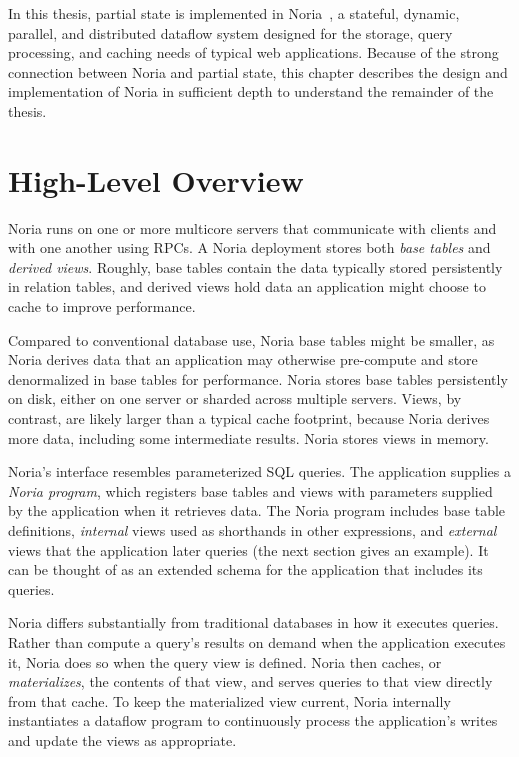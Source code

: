 In this thesis, partial state is implemented in Noria~\cite{noria}, a stateful,
dynamic, parallel, and distributed dataflow system designed for the storage,
query processing, and caching needs of typical web applications. Because of the
strong connection between Noria and partial state, this chapter describes the
design and implementation of Noria in sufficient depth to understand the
remainder of the thesis.

\section{High-Level Overview}

Noria runs on one or more multicore servers that communicate with clients and
with one another using RPCs. A Noria deployment stores both \emph{base tables}
and \emph{derived views}. Roughly, base tables contain the data typically stored
persistently in relation tables, and derived views hold data an application
might choose to cache to improve performance.

Compared to conventional database use, Noria base tables might be smaller, as
Noria derives data that an application may otherwise pre-compute and store
denormalized in base tables for performance. Noria stores base tables
persistently on disk, either on one server or sharded across multiple servers.
Views, by contrast, are likely larger than a typical cache footprint, because
Noria derives more data, including some intermediate results. Noria stores views
in memory.

Noria's interface resembles parameterized SQL queries. The application supplies
a \emph{Noria program}, which registers base tables and views with parameters
supplied by the application when it retrieves data. The Noria program includes
base table definitions, \emph{internal} views used as shorthands in other
expressions, and \emph{external} views that the application later queries
(the next section gives an example). It can be thought of as an extended schema
for the application that includes its queries.

Noria differs substantially from traditional databases in how it executes
queries. Rather than compute a query's results on demand when the application
executes it, Noria does so when the query view is defined. Noria then caches, or
\emph{materializes}, the contents of that view, and serves queries to that view
directly from that cache. To keep the materialized view current, Noria
internally instantiates a dataflow program to continuously process the
application's writes and update the views as appropriate.

